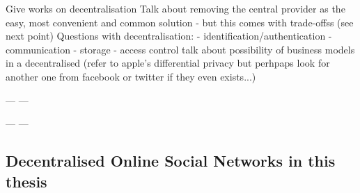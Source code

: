 \documentclass[showtrims,oldfontcommands]{kthesis}
\begin{document}
Give works on decentralisation
Talk about removing the central provider as the easy, most convenient and common
 solution - but this comes with trade-offss (see next point)
Questions with decentralisation:
- identification/authentication
- communication
- storage
- access control
talk about possibility of business models in a decentralised (refer to apple's differential 
privacy but perhpaps look for another one from facebook or twitter if they even exists...)


---
---

---
%
%
%
---

\subsection{Decentralised Online Social Networks in this thesis}
    \label{subsection:dosns-in-this-thesis}
\end{document}
